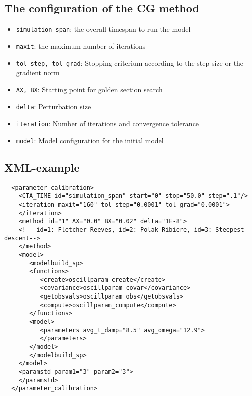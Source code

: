 \subsection{The configuration of the CG method}
\begin{itemize}
\item {\tt simulation\_span}: the overall timespan to run the model
\item {\tt maxit}: the maximum number of iterations
\item {\tt tol\_step, tol\_grad}: Stopping criterium  according to the step
  size or the gradient norm
\item {\tt AX, BX}: Starting point for golden section search
\item {\tt delta}: Perturbation size 
\item {\tt iteration}: Number of iterations and convergence tolerance
\item {\tt model}: Model configuration for the initial model
\end{itemize}

\subsection {XML-example}
   \begin{verbatim}
  <parameter_calibration>
    <CTA_TIME id="simulation_span" start="0" stop="50.0" step=".1"/>
    <iteration maxit="160" tol_step="0.0001" tol_grad="0.0001">
    </iteration>
    <method id="1" AX="0.0" BX="0.02" delta="1E-8">
    <!-- id=1: Fletcher-Reeves, id=2: Polak-Ribiere, id=3: Steepest-descent-->
    </method>
    <model>
       <modelbuild_sp>
       <functions>
          <create>oscillparam_create</create>
          <covariance>oscillparam_covar</covariance>
          <getobsvals>oscillparam_obs</getobsvals>
          <compute>oscillparam_compute</compute>
       </functions>
       <model>
          <parameters avg_t_damp="8.5" avg_omega="12.9">
          </parameters>
       </model>
       </modelbuild_sp>
    </model>
    <paramstd param1="3" param2="3">
    </paramstd>
  </parameter_calibration>
   \end{verbatim}

